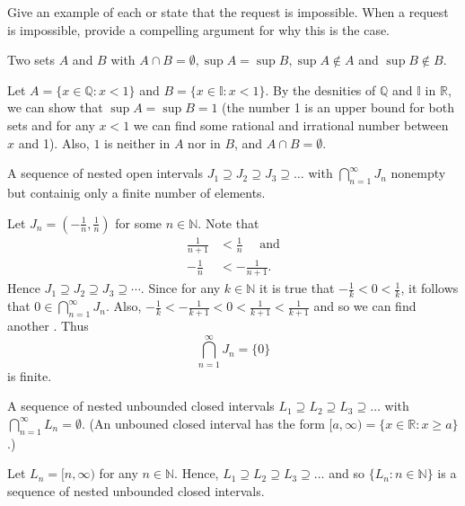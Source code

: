 \documentclass[12pt]{article}
\newcommand{\N}{\mathbb{N}}
\newcommand{\R}{\mathbb{R}}
\newcommand{\Q}{\mathbb{Q}}
\newenvironment{problem}[2][Problem]{\begin{trivlist}
		\item[\hskip \labelsep {\bfseries #1}\hskip \labelsep {\bfseries #2.}]}{\end{trivlist}}
\newenvironment{solution}[2][Solution]{\begin{trivlist}
		\item[\hskip \labelsep {\bfseries #1}\hskip \labelsep {\bfseries #2.}]}{\end{trivlist}}
\begin{document}
	\begin{problem}{1.4.8}
		Give an example of each or state that the request is impossible. When a request is impossible, provide a compelling argument for why this is the case.
		\begin{enumerate}[label=(\alph*)]
			\item Two sets $A$ and $B$ with $A\cap B = \emptyset, \sup A=\sup B, \sup A \not\in A$ and $\sup B \not\in B$.
			\begin{solution}{(a)}
				Let $A=\{x\in \Q:x<1\}$ and $B=\{x\in \mathbb{I}:x<1\}$. By the desnities of $\Q$ and $\mathbb{I}$ in $\R$, we can show that $\sup A = \sup B = 1$ (the number 1 is an upper bound for both sets and for any $x<1$ we can find some rational and irrational number between $x$ and 1). Also, $1$ is neither in $A$ nor in $B$, and $A\cap B = \emptyset$. 
			\end{solution}
			\item A sequence of nested open intervals $J_{1} \supseteq J_{2} \supseteq J_{3} \supseteq \ldots$ with $\bigcap^{\infty}_{n=1} J_{n}$ nonempty but containig only a finite number of elements.
			\begin{solution}{(b)}
				Let $J_{n} = (-\frac{1}{n},\frac{1}{n})$ for some $n\in \N$. Note that 
				\begin{align*}
					\frac{1}{n+1}&<\frac{1}{n} \quad \text{ and}\\
					-\frac{1}{n} &< -\frac{1}{n+1}.
				\end{align*}
				Hence $J_{1}\supseteq J_{2} \supseteq J_{3} \supseteq \cdots$.
				Since for any $k\in \N$ it is true that $-\frac{1}{k}<0<\frac{1}{k}$, it follows that $0\in \bigcap_{n=1}^{\infty}J_{n}$. Also, $-\frac{1}{k} < -\frac{1}{k+1}< 0 < \frac{1}{k+1} < \frac{1}{k+1}$ and so we can find another . Thus
				\begin{equation*}
					\bigcap_{n=1}^{\infty} J_{n} = \{0\}
				\end{equation*}
			is finite.
			\end{solution}
			\item A sequence of nested unbounded closed intervals $L_{1} \supseteq L_{2} \supseteq L_{3} \supseteq \ldots$ with $\bigcap_{n=1}^{\infty} L_{n} = \emptyset$. (An unbouned closed interval has the form $[a,\infty) = \{x\in \R : x\geq a\}$.)
			\begin{solution}{(c)}
				Let $L_{n} = [n,\infty)$ for any $n\in \N$. Hence, $L_{1} \supseteq L_{2} \supseteq L_{3} \supseteq \ldots$ and so $\{L_{n}:n\in \N\}$ is a sequence of nested unbounded closed intervals. \\

\end{solution}
\end{enumerate}
\end{problem}
\end{document}
